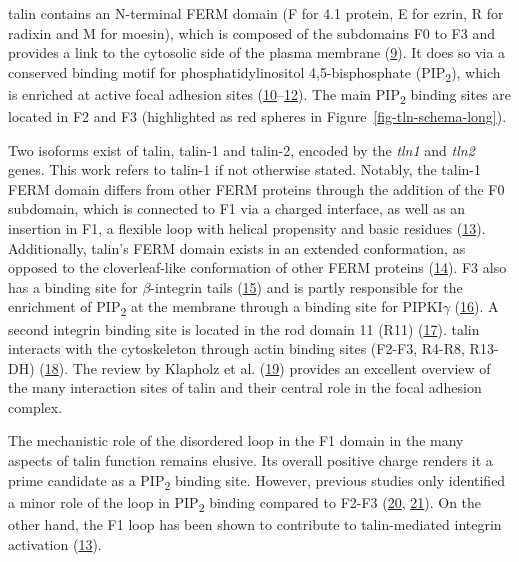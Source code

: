 \documentclass[
  twocolumn]{biophys-new-mod}
\begin{document}
talin contains an N-terminal FERM domain (F for 4.1 protein, E for
ezrin, R for radixin and M for moesin), which is composed of the
subdomains F0 to F3 and provides a link to the cytosolic side of the
plasma membrane
(\protect\hyperlink{ref-chishtiFERMDomainUnique1998}{9}). It does so via
a conserved binding motif for phosphatidylinositol 4,5-bisphosphate
(PIP\textsubscript{2}), which is enriched at active focal adhesion sites
(\protect\hyperlink{ref-maniFERMDomainPhosphoinositide2011}{10}--\protect\hyperlink{ref-songNovelMembranedependentSwitch2012a}{12}).
The main PIP\textsubscript{2} binding sites are located in F2 and F3
(highlighted as red spheres in Figure~\ref{fig-tln-schema-long}).

Two isoforms exist of talin, talin-1 and talin-2, encoded by the
\emph{tln1} and \emph{tln2} genes. This work refers to talin-1 if not
otherwise stated. Notably, the talin-1 FERM domain differs from other
FERM proteins through the addition of the F0 subdomain, which is
connected to F1 via a charged interface, as well as an insertion in F1,
a flexible loop with helical propensity and basic residues
(\protect\hyperlink{ref-goultStructureDoubleUbiquitinlike2010}{13}).
Additionally, talin's FERM domain exists in an extended conformation, as
opposed to the cloverleaf-like conformation of other FERM proteins
(\protect\hyperlink{ref-elliottStructureTalinHead2010}{14}). F3 also has
a binding site for \(\beta\)-integrin tails
(\protect\hyperlink{ref-calderwoodTalinHeadDomain1999}{15}) and is
partly responsible for the enrichment of PIP\textsubscript{2} at the
membrane through a binding site for PIPKI\(\gamma\)
(\protect\hyperlink{ref-calderwoodTalinsKindlinsPartners2013}{16}). A
second integrin binding site is located in the rod domain 11 (R11)
(\protect\hyperlink{ref-horwitzInteractionPlasmaMembrane1986}{17}).
talin interacts with the cytoskeleton through actin binding sites
(F2-F3, R4-R8, R13-DH)
(\protect\hyperlink{ref-mccannLWEQModuleConserved1997}{18}). The review
by Klapholz et al.
(\protect\hyperlink{ref-klapholzTalinMasterIntegrin2017}{19}) provides
an excellent overview of the many interaction sites of talin and their
central role in the focal adhesion complex.

The mechanistic role of the disordered loop in the F1 domain in the many
aspects of talin function remains elusive. Its overall positive charge
renders it a prime candidate as a PIP\textsubscript{2} binding site.
However, previous studies only identified a minor role of the loop in
PIP\textsubscript{2} binding compared to F2-F3
(\protect\hyperlink{ref-chinthalapudiInteractionTalinCell2018a}{20},
\protect\hyperlink{ref-saltelNewPIP22009}{21}). On the other hand, the
F1 loop has been shown to contribute to talin-mediated integrin
activation
(\protect\hyperlink{ref-goultStructureDoubleUbiquitinlike2010}{13}).
\end{document}
